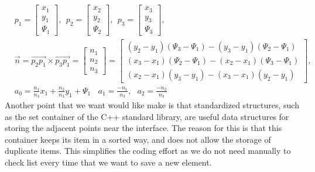 \documentclass[review]{elsarticle}
\begin{document}
\begin{align}
&p_1=
\begin{bmatrix}
    x_1 \\
    y_1 \\
    \varPsi_1
\end{bmatrix}
,\ \ 
p_2=
\begin{bmatrix}
    x_2 \\
    y_2 \\
    \varPsi_2
\end{bmatrix} 
,\ \ p_3=
\begin{bmatrix}
    x_3 \\
    y_3 \\
    \varPsi_3
\end{bmatrix}, \nonumber\\
&\overrightarrow{n}=\overrightarrow{p_2p_1}\times\overrightarrow{p_3p_1}=
\begin{bmatrix}
    n_1 \\
    n_2 \\
    n_3
\end{bmatrix}=
\begin{bmatrix}
    (y_2-y_1)(\varPsi_3-\varPsi_1)-(y_3-y_1)(\varPsi_2-\varPsi_1) \\
    (x_3-x_1)(\varPsi_2-\varPsi_1)-(x_2-x_1)(\varPsi_3-\varPsi_1) \\
    (x_2-x_1)(y_3-y_1)-(x_3-x_1)(y_2-y_1)
\end{bmatrix},\\
&a_0=\frac{n_1}{n_3}x_1+\frac{n_2}{n_3}y_1+\varPsi_1 \ \ \  \ a_1=\frac{-n_1}{n_3}, \ \ \ a_2=\frac{-n_2}{n_3}
\end{align}
Another point that we want would like make is that standardized structures, such as the set container of the C++ standard library, are useful data structures for storing the 
adjacent points near the interface. The reason for this is that this container keeps its item in a sorted way, and does not allow the storage of duplicate items. 
This simplifies the coding effort as we do not need manually to check list every time that we want to save a new element. 
\end{document}
